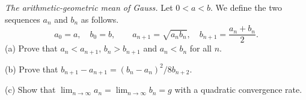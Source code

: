 \emph{The arithmetic-geometric mean of Gauss.} Let $0 < a < b$. We define the two sequences $a_n$ and $b_n$ as follows.
\[ a_0 = a,\quad b_0 = b,\qquad a_{n+1} = \sqrt{a_n b_n},\quad b_{n+1} = \frac{a_n + b_n}{2}. \]
(a) Prove that $a_n < a_{n+1}$, $b_n > b_{n+1}$ and $a_n < b_n$ for all $n$.

(b) Prove that $b_{n+1} - a_{n+1} = (b_n - a_n)^2/8b_{n+2}$.

(c) Show that $\lim_{n\to\infty} a_n = \lim_{n\to\infty} b_n = g$ with a quadratic convergence rate.
